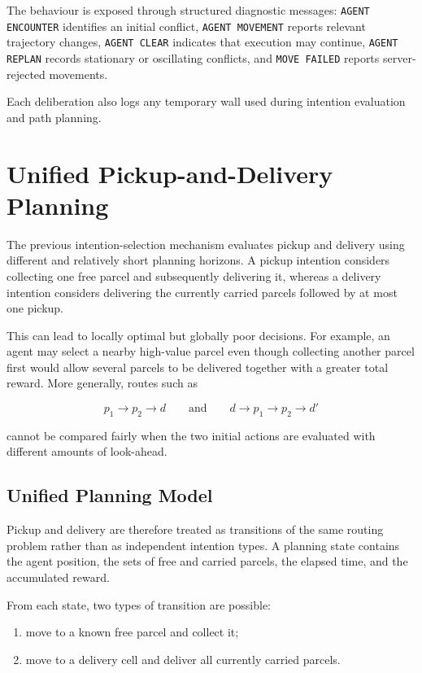 \documentclass[a4paper]{article}
\begin{document}
The behaviour is exposed through structured diagnostic messages:
\texttt{AGENT ENCOUNTER} identifies an initial conflict,
\texttt{AGENT MOVEMENT} reports relevant trajectory changes,
\texttt{AGENT CLEAR} indicates that execution may continue,
\texttt{AGENT REPLAN} records stationary or oscillating conflicts, and
\texttt{MOVE FAILED} reports server-rejected movements.

Each deliberation also logs any temporary wall used during intention evaluation
and path planning.

\newpage

\section{Unified Pickup-and-Delivery Planning}
\label{sec:unified-planning}

The previous intention-selection mechanism evaluates pickup and delivery using
different and relatively short planning horizons. A pickup intention considers
collecting one free parcel and subsequently delivering it, whereas a delivery
intention considers delivering the currently carried parcels followed by at
most one pickup.

This can lead to locally optimal but globally poor decisions. For example, an
agent may select a nearby high-value parcel even though collecting another
parcel first would allow several parcels to be delivered together with a
greater total reward. More generally, routes such as

\[
    p_1 \rightarrow p_2 \rightarrow d
    \qquad\text{and}\qquad
    d \rightarrow p_1 \rightarrow p_2 \rightarrow d'
\]

cannot be compared fairly when the two initial actions are evaluated with
different amounts of look-ahead.

\subsection{Unified Planning Model}

Pickup and delivery are therefore treated as transitions of the same routing
problem rather than as independent intention types. A planning state contains
the agent position, the sets of free and carried parcels, the elapsed time, and
the accumulated reward.

From each state, two types of transition are possible:

\begin{enumerate}
    \item move to a known free parcel and collect it;
    \item move to a delivery cell and deliver all currently carried parcels.
\end{enumerate}
\end{document}
